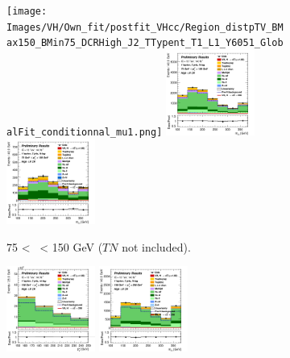 \newpage
\vspace*{\fill} 


\begin{figure}[h!]
    \centering
    \begin{subfigure}[b]{\textwidth}
        \centering
        \texttt{[image: Images/VH/Own\_fit/postfit\_VHcc/Region\_distpTV\_BMax150\_BMin75\_DCRHigh\_J2\_TTypent\_T1\_L1\_Y6051\_GlobalFit\_conditionnal\_mu1.png]}
        \includegraphics[width=0.32\textwidth]{Images/VH/Own_fit/postfit_VHcc/Region_distmBB_BMax150_BMin75_DCRHigh_J2_TTypelt_T2_L1_Y6051_GlobalFit_conditionnal_mu1.png}
        \includegraphics[width=0.32\textwidth]{Images/VH/Own_fit/postfit_VHcc/Region_distmBB_BMax150_BMin75_DCRHigh_J2_TTypett_T2_L1_Y6051_GlobalFit_conditionnal_mu1.png}
        \caption{75 < \ptv\ < 150 GeV ($TN$ not included).}
        \label{fig:plots_VHcc_1L_75_CRH_2J}
    \end{subfigure}
    \begin{subfigure}[b]{\textwidth}
        \centering
        \includegraphics[width=0.32\textwidth]{Images/VH/Own_fit/postfit_VHcc/Region_distpTV_BMax250_BMin150_DCRHigh_J2_TTypent_T1_L1_Y6051_GlobalFit_conditionnal_mu1.png}
        \includegraphics[width=0.32\textwidth]{Images/VH/Own_fit/postfit_VHcc/Region_distmBB_BMax250_BMin150_DCRHigh_J2_TTypelt_T2_L1_Y6051_GlobalFit_conditionnal_mu1.png}

\end{subfigure}
\end{figure}
